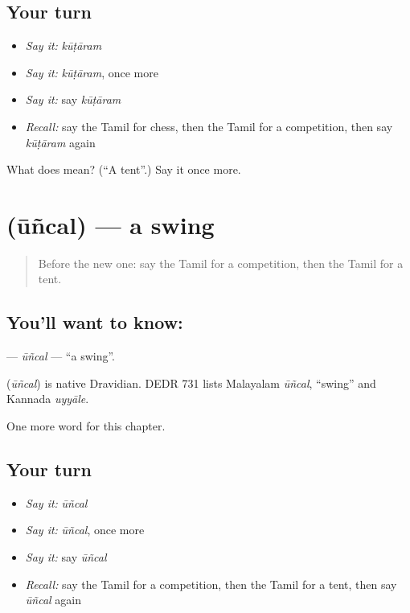 \subsection*{Your turn}
\begin{itemize}
\raggedright
  \item \emph{Say it:} \emph{kūṭāram}
  \item \emph{Say it:} \emph{kūṭāram}, once more
  \item \emph{Say it:} say \emph{kūṭāram}
  \item \emph{Recall:} say the Tamil for chess, then the Tamil for a competition, then say \emph{kūṭāram} again
\end{itemize}

\begin{tcolorbox}[breakable,colback=teal!4,colframe=teal!35!black,title={Before you move on}]
What does  mean? (\textquotedblleft{}A tent\textquotedblright{}.) Say it once more.
\end{tcolorbox}
\section[\texorpdfstring{\ta{ஊஞ்சல்} (ūñcal)}{ஊஞ்சல் (ūñcal)}]{ (ūñcal) — a swing}

\label{lesson:TA-C250-uncal}



\begin{quote}
Before the new one: say the Tamil for a competition, then the Tamil for a tent.
\end{quote}

\subsection*{You'll want to know: }
\textbf{} — \emph{ūñcal} — \textquotedblleft{}a swing\textquotedblright{}.

\begin{cousinweb}
\textbf{} (\emph{ūñcal}) is native Dravidian. DEDR 731 lists Malayalam \emph{ūñcal}, \textquotedblleft{}swing\textquotedblright{} and Kannada \emph{uyyāle}.
\end{cousinweb}

\begin{grammarlens}[title={What you've built}]
One more word for this chapter.
\end{grammarlens}

\subsection*{Your turn}
\begin{itemize}
\raggedright
  \item \emph{Say it:} \emph{ūñcal}
  \item \emph{Say it:} \emph{ūñcal}, once more
  \item \emph{Say it:} say \emph{ūñcal}
  \item \emph{Recall:} say the Tamil for a competition, then the Tamil for a tent, then say \emph{ūñcal} again
\end{itemize}

